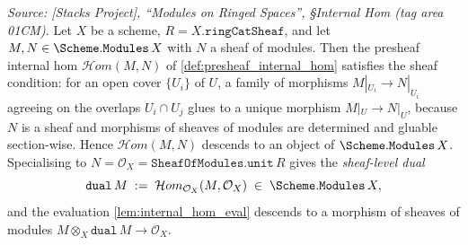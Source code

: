 \begin{lemma}


  \label{lem:internal_hom_isSheaf}
  \textit{Source: [Stacks Project], ``Modules on Ringed Spaces'', \S Internal Hom
  (tag area 01CM).}
  Let \(X\) be a scheme, \(R = X.\mathtt{ringCatSheaf}\), and let
  \(M, N \in \Scheme.\mathtt{Modules}\,X\) with \(N\) a sheaf of modules. Then the
  presheaf internal hom \(\mathcal{H}om(M, N)\) of \cref{def:presheaf_internal_hom}
  satisfies the sheaf condition: for an open cover \(\{U_i\}\) of \(U\), a family of
  morphisms \(M|_{U_i} \to N|_{U_i}\) agreeing on the overlaps
  \(U_i \cap U_j\) glues to a unique morphism \(M|_U \to N|_U\), because \(N\) is a
  sheaf and morphisms of sheaves of modules are determined and gluable section-wise.
  Hence \(\mathcal{H}om(M, N)\) descends to an object of \(\Scheme.\mathtt{Modules}\,X\).
  Specialising to \(N = \mathcal{O}_X = \mathtt{SheafOfModules.unit}\,R\) gives the
  \emph{sheaf-level dual}
  \[
    \mathtt{dual}\,M \;:=\; \mathcal{H}om_{\mathcal{O}_X}(M, \mathcal{O}_X)
    \;\in\; \Scheme.\mathtt{Modules}\,X,
  \]
  and the evaluation \cref{lem:internal_hom_eval} descends to a morphism of sheaves of
  modules \(M \otimes_X \mathtt{dual}\,M \to \mathcal{O}_X\).
\end{lemma}

